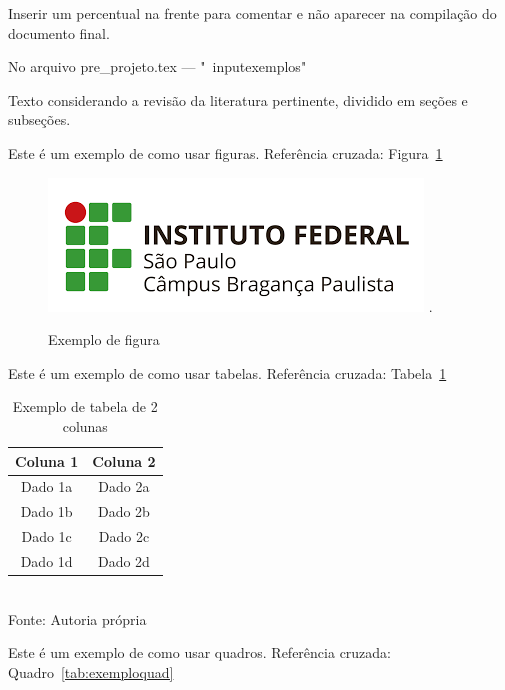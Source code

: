 

Inserir um percentual na frente para comentar e não aparecer na compilação do documento final. 

No arquivo pre\_projeto.tex --- "\ input{exemplos}"

Texto considerando a revisão da literatura pertinente, dividido em seções e subseções.

Este é um exemplo de como usar figuras. Referência cruzada: Figura~\ref{fig:exemplo}


\begin{figure}[!htbp]
	\centering
	\caption{Exemplo de figura}
	\includegraphics[scale=1]{imagens/IFSP-BRA.png}
	.
	\label{fig:exemplo}
\end{figure}



Este é um exemplo de como usar tabelas. Referência cruzada: Tabela~\ref{tab:exemplo}


\begin{table}[!htbp]
\centering
\caption{Exemplo de tabela de 2 colunas}
	\begin{tabular}{ c | c }
		\hline
		\textbf{Coluna 1} & \textbf{Coluna 2} \\ \hline
		Dado 1a           & Dado 2a           \\ \hline
		Dado 1b           & Dado 2b           \\ \hline
		Dado 1c           & Dado 2c           \\ \hline
		Dado 1d           & Dado 2d           \\ \hline
	\end{tabular}
	\\ \vspace{0.2cm}
	Fonte: Autoria própria
	\label{tab:exemplo}
\end{table}



Este é um exemplo de como usar quadros. Referência cruzada: Quadro~\ref{tab:exemploquad}


